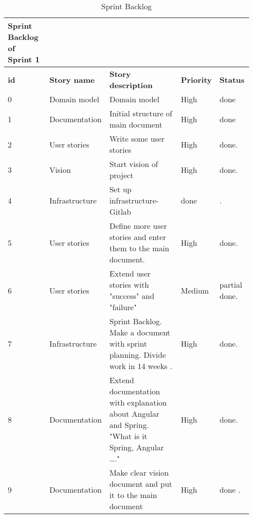 \documentclass{scrartcl}
\begin{document}
\begin{table}[H]

\begin{center}
\begin{tabular}{| p{2.5cm}| p{4cm} | p{5cm} |p{2.5cm} | p{4cm}|}
   Sprint Backlog of Sprint 1\\ \hline
    

          \textbf{id}  &  \textbf{Story name} &  \textbf{Story description} &  \textbf{Priority}  & \textbf{Status}\\ \hline
         0 & Domain model & Domain model & High & done \\ \hline
        1 & Documentation  & Initial structure of main document & High & done \\ \hline
        
           2 &  User stories  & Write some user stories  & High & done. \\ \hline
           3 &  Vision &  Start vision of project & High  & done. \\ \hline
            4 & Infrastructure & Set up infrastructure- Gitlab & done & . \\ \hline
             5 &  User stories & Define more user stories and enter them to the main document. & High & done. \\ \hline
              6 & User stories & Extend user stories with "success" and "failure" & Medium & partial done. \\ \hline
               7 & Infrastructure & Sprint Backlog. Make a document with sprint planning. Divide work in 14 weeks .  & High &  done. \\ \hline
                8 & Documentation & Extend documentation with explanation about Angular and Spring. "What is it Spring, Angular …." & High & done. \\ \hline
                9 & Documentation & Make clear vision document and put it to the main document & High & done . \\ \hline
                  \end{tabular}
    \end{center}
    \caption{Sprint Backlog}
    \label{tab:typo}
\end{table}
\end{document}
